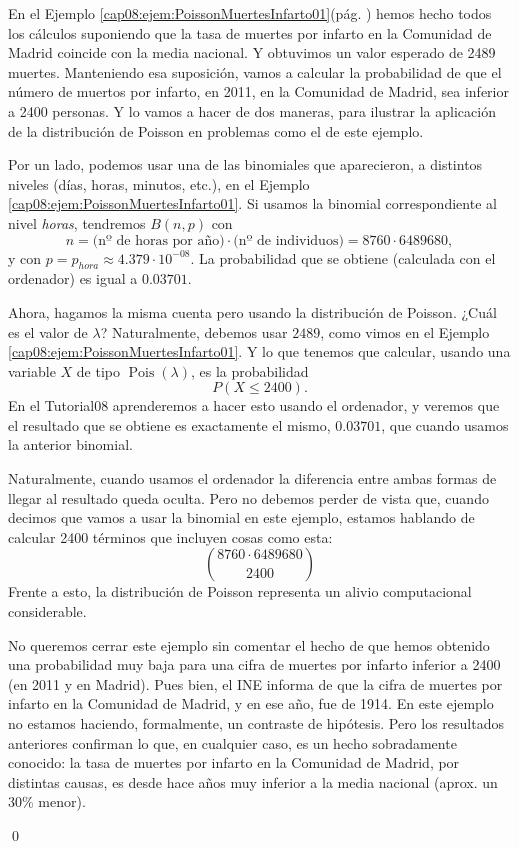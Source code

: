 \begin{ejemplo}
\label{cap08:ejem:PoissonMuertesInfarto02} En el Ejemplo
\ref{cap08:ejem:PoissonMuertesInfarto01}(pág. \pageref{cap08:ejem:PoissonMuertesInfarto01}) hemos
hecho todos los cálculos suponiendo que la tasa de muertes por infarto en la Comunidad de Madrid
coincide con la media nacional. Y  obtuvimos un valor esperado de 2489 muertes. Manteniendo esa
suposición, vamos a calcular la probabilidad de que el número de muertos por infarto, en 2011, en
la Comunidad de Madrid, sea inferior a 2400 personas. Y lo vamos a hacer de dos maneras, para
ilustrar la aplicación de la distribución de Poisson en problemas como el de este ejemplo.

Por un lado, podemos usar una de las binomiales que aparecieron, a distintos niveles (días, horas,
minutos, etc.), en el Ejemplo \ref{cap08:ejem:PoissonMuertesInfarto01}. Si usamos la binomial
correspondiente al nivel {\em horas}, tendremos $B(n,p)$ con
\[n= \mbox{(nº de horas por año)}\cdot \mbox{(nº de individuos)}=8760 \cdot 6489680,\]
y con $p=p_{hora}\approx 4.379\cdot 10^{-08}$. La probabilidad  que se obtiene (calculada con el ordenador) es
igual a $0.03701$.

Ahora, hagamos la misma cuenta pero usando la distribución de Poisson. ¿Cuál es el valor de
$\lambda$? Naturalmente, debemos usar $2489$, como vimos en el Ejemplo
\ref{cap08:ejem:PoissonMuertesInfarto01}. Y lo que tenemos que calcular, usando una variable $X$ de
tipo $\operatorname{Pois}(\lambda)$, es la probabilidad
\[P(X\leq 2400).\]
En el Tutorial08 aprenderemos a hacer esto usando el ordenador, y veremos que el resultado que se obtiene es exactamente el mismo, $0.03701$, que cuando usamos la anterior binomial.

Naturalmente, cuando usamos el ordenador la diferencia entre ambas formas de llegar al resultado
queda oculta. Pero no debemos perder de vista que, cuando decimos que vamos a usar la binomial en
este ejemplo, estamos hablando de calcular 2400 términos que incluyen cosas como esta:
\[\binom{8760 \cdot 6489680}{2400}\]
Frente a esto, la distribución de Poisson representa un alivio computacional considerable.

No queremos cerrar este ejemplo sin comentar el hecho de que hemos obtenido una probabilidad muy
baja para una cifra de muertes por infarto inferior a 2400 (en 2011 y en Madrid). Pues bien, el INE
informa de que la cifra de muertes por infarto en la Comunidad de Madrid, y en ese año, fue de
1914. En este ejemplo no estamos haciendo, formalmente, un contraste de hipótesis. Pero los
resultados anteriores confirman lo que, en cualquier caso, es un hecho sobradamente conocido: la
tasa de muertes por infarto en la Comunidad de Madrid, por distintas causas, es desde hace años muy
inferior a la media nacional (aprox. un 30\% menor).

\qed
\end{ejemplo}


